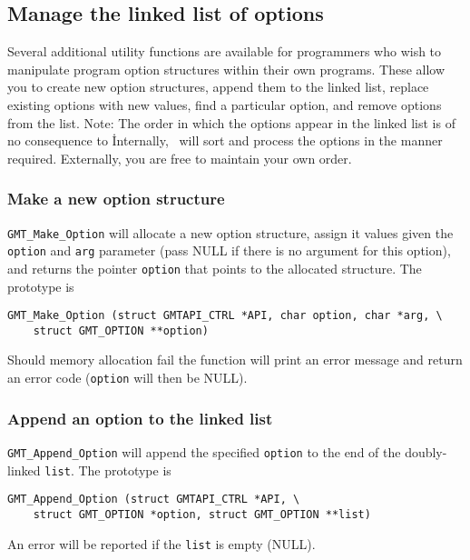 \documentclass{report}
\begin{document}
\subsection{Manage the linked list of options}

Several additional utility functions are available for programmers who wish to manipulate
program option structures within their own programs.  These allow you to create new
option structures, append them to the linked list, replace existing options with new
values, find a particular option, and remove options from the list.  Note: The
order in which the options appear in the linked list is of no consequence to \GMT\.
Internally, \GMT\ will sort and process the options in the manner required.
Externally, you are free to maintain your own order.

\subsubsection{Make a new option structure}

\texttt{GMT\_Make\_Option} will allocate a new option structure, assign it values
given the \texttt{option} and \texttt{arg} parameter (pass NULL if there is no
argument for this option), and returns the pointer \texttt{option} that points
to the allocated structure.  The prototype is

\begin{verbatim}
GMT_Make_Option (struct GMTAPI_CTRL *API, char option, char *arg, \
    struct GMT_OPTION **option)
\end{verbatim}
Should memory allocation fail the function will print an error message
and return an error code (\texttt{option} will then be NULL).

\subsubsection{Append an option to the linked list}

\texttt{GMT\_Append\_Option} will append the specified \texttt{option} to the end
of the doubly-linked \texttt{list}.  The prototype is

\begin{verbatim}
GMT_Append_Option (struct GMTAPI_CTRL *API, \
    struct GMT_OPTION *option, struct GMT_OPTION **list)
\end{verbatim}
An error will be reported if the \texttt{list} is empty (NULL).
\end{document}
